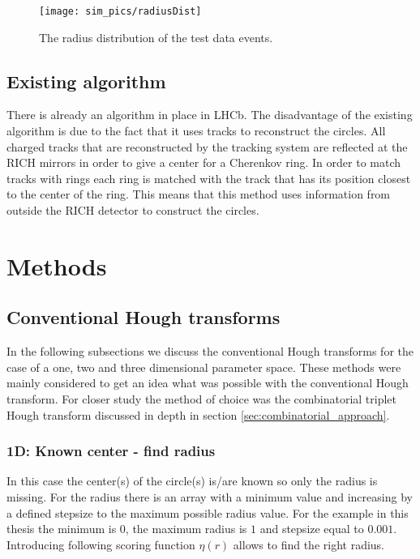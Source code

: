 \documentclass[11pt,twoside]{scrreprt}
\begin{document}
\begin{figure}[tb]
  \centering
  \texttt{[image: sim\_pics/radiusDist]}
  \caption{The radius distribution of the test data events.}
  \label{fig:radius_dist}
\end{figure}

\section{Existing algorithm} %
\label{sub:existing_algorithm}
There is already an algorithm in place in LHCb. The disadvantage of the existing algorithm is due to the fact that it
uses tracks to reconstruct the circles. All charged tracks that are reconstructed by the tracking system are reflected at
the RICH mirrors in order to give a center for a Cherenkov ring. In order to match tracks with rings each ring is matched
with the track that has its position closest to the center of the ring. This means that this method uses information from
outside the RICH detector to construct the circles.


\chapter{Methods}

\section{Conventional Hough transforms} %
\label{sec:conventional_hough_transforms}

In the following subsections we discuss the conventional Hough transforms for the case of a one, two and three dimensional parameter space. These
methods were mainly considered to get an idea what was possible with the conventional Hough transform. For closer study the method of choice was
the combinatorial triplet Hough transform discussed in depth in section \ref{sec:combinatorial_approach}.

\subsection{1D: Known center - find radius} %
\label{sub:1d_known_center_find_radius}

In this case the center(s) of the circle(s) is/are known so only the radius is missing. For the radius there is an array with a minimum value
and increasing by a defined stepsize to the maximum possible radius value. For the example in this thesis the minimum is $0$, the maximum radius
is $1$ and stepsize equal to $0.001$. Introducing following scoring function $\eta(r)$ allows to find the right radius.
\end{document}
